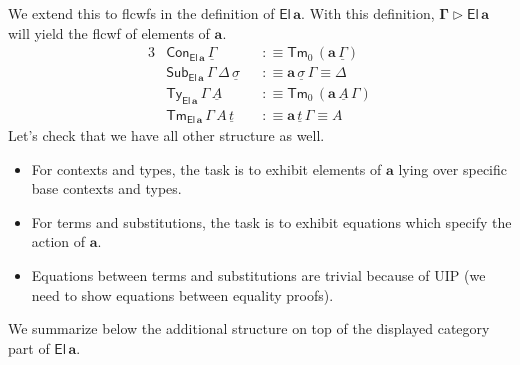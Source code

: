 \documentclass[12pt,a4paper,twoside,openany]{book}
\theoremstyle{remark}
\theoremstyle{definition}
\theoremstyle{theorem}
\newcommand{\bs}[1]{\boldsymbol{#1}}
\newcommand{\Con}{\mathsf{Con}}
\newcommand{\Sub}{\mathsf{Sub}}
\newcommand{\Tm}{\mathsf{Tm}}
\newcommand{\Ty}{\mathsf{Ty}}
\newcommand{\El}{\mathsf{El}}
\newcommand{\ext}{\triangleright}
\newcommand{\ba}{\bs{a}}
\newcommand{\ul}[1]{\underline{#1}}
\newcommand{\ulGamma}{\ul{\Gamma}}
\newcommand{\ulsigma}{\ul{\sigma}}
\newcommand{\ult}{\ul{t}}
\newcommand{\ulA}{\ul{A}}
\newcommand{\defn}{:\equiv}
\begin{document}
We extend this to flcwfs in the definition of $\bs{\El\,a}$. With this
definition, $\bs{\Gamma \ext \El\,a}$ will yield the flcwf of elements of $\ba$.
\begin{alignat*}{3}
  &\Con_{\bs{\El\,a}}\,\ulGamma &&\defn \Tm_0\,(\ba\,\ulGamma) \\
  &\Sub_{\bs{\El\,a}}\,\Gamma\,\Delta\,\ulsigma &&\defn \ba\,\ulsigma\,\Gamma \equiv \Delta \\
  &\Ty_{\bs{\El\,a}}\,\Gamma\,\ulA &&\defn \Tm_0\,(\ba\,\ulA\,\Gamma)\\
  &\Tm_{\bs{\El\,a}}\,\Gamma\,A\,\ult &&\defn \ba\,\ult\,\Gamma \equiv A
\end{alignat*}
Let's check that we have all other structure as well.
\begin{itemize}
  \item For contexts and types, the task is to exhibit elements of $\ba$ lying over
        specific base contexts and types.
  \item For terms and substitutions, the task is to exhibit equations which
    specify the action of $\ba$.
  \item Equations between terms and substitutions are trivial because of UIP (we need
    to show equations between equality proofs).
\end{itemize}
We summarize below the additional structure on top of the displayed category
part of $\bs{\El\,a}$.
\end{document}
